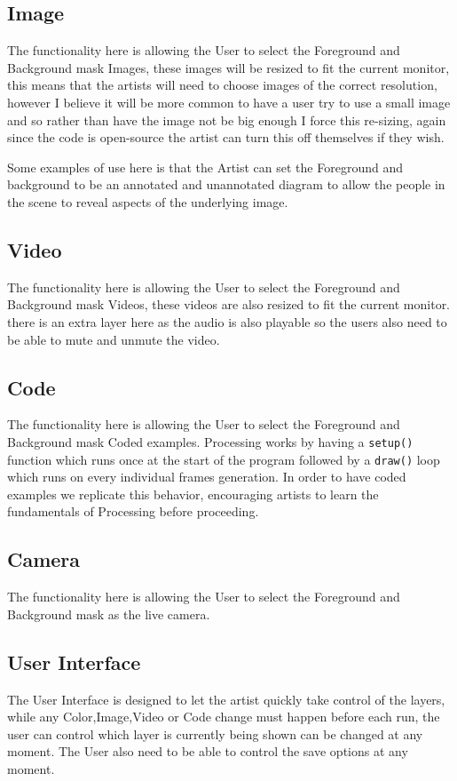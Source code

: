 \documentclass[a4paper]{report}
\begin{document}
\subsection{Image}
The functionality here is allowing the User to select the Foreground and Background mask Images, these images will be resized to fit the current monitor, this means that the artists will need to choose images of the correct resolution, however I believe it will be more common to have a user try to use a small image and so rather than have the image not be big enough I force this re-sizing, again since the code is open-source the artist can turn this off themselves if they wish.

Some examples of use here is that the Artist can set the Foreground and background to be an annotated and unannotated diagram to allow the people in the scene to reveal aspects of the underlying image.

\subsection{Video}
The functionality here is allowing the User to select the Foreground and Background mask Videos, these videos are also resized to fit the current monitor. there is an extra layer here as the audio is also playable so the users also need to be able to mute and unmute the video.

\subsection{Code}
The functionality here is allowing the User to select the Foreground and Background mask Coded examples. Processing \cite{PROCESSING} works by having a 
\verb|setup()| function which runs once at the start of the program followed by a \verb|draw()| loop which runs on every individual frames generation. In order to have coded examples we replicate this behavior, encouraging artists to learn the fundamentals of Processing before proceeding.

\subsection{Camera}
The functionality here is allowing the User to select the Foreground and Background mask as the live camera.

\subsection{User Interface}
The User Interface is designed to let the artist quickly take control of the layers, while any Color,Image,Video or Code change must happen before each run, the user can control which layer is currently being shown can be changed at any moment. The User also need to be able to control the save options at any moment.
\end{document}

